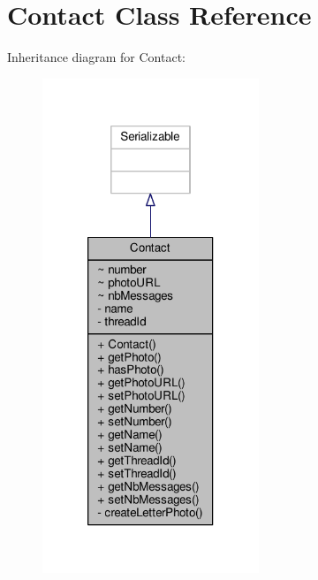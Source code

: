 \hypertarget{a00005}{\section{Contact Class Reference}
\label{a00005}
}


Inheritance diagram for Contact\+:
\nopagebreak
\begin{figure}[H]
\begin{center}
\leavevmode
\includegraphics[width=184pt]{a00044}
\end{center}
\end{figure}


